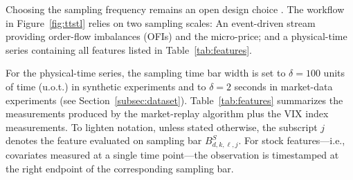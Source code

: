 \documentclass[10pt,a4paper,oneside]{article}
\begin{document}
Choosing the sampling frequency remains an open design choice \cite{dutta2023review}. The workflow in Figure~\ref{fig:ttstl} relies on two sampling scales: An event-driven stream providing order-flow imbalances (OFIs) and the micro-price; and a physical-time series containing all features listed in Table~\ref{tab:features}.

For the physical-time series, the sampling time bar width is set to $\delta=100$ units of time (u.o.t.) in synthetic experiments and to $\delta=2$ seconds in market-data experiments (see Section~\ref{subsec:dataset}). Table~\ref{tab:features} summarizes the measurements produced by the market-replay algorithm plus the VIX index measurements. To lighten notation, unless stated otherwise, the subscript $j$ denotes the feature evaluated on sampling bar $B^{S}_{d,k,\ell,j}$. For stock features—i.e., covariates measured at a single time point—the observation is timestamped at the right endpoint of the corresponding sampling bar.






\end{document}
